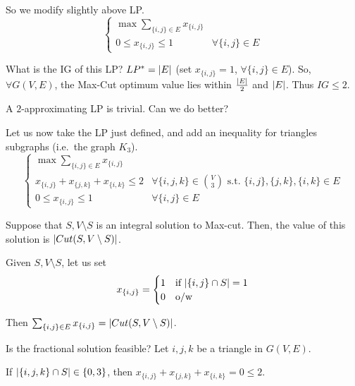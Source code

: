     So we modify slightly above LP.\@
    \begin{equation}
        \begin{cases}
            \max \sum_{\{i,j\} \in E} x_{\{i,j\}}\\
            0 \leq x_{\{i,j\}} \leq 1               & \forall \{i,j\} \in E
        \end{cases}
    \end{equation}

    What is the IG of this LP?
    $LP^* = \vert E \vert$ (set $x_{\{i,j\}} = 1$, $\forall \{i,j\} \in E$).
    So, $\forall G(V,E)$, the Max-Cut optimum value lies within $\frac{\vert E \vert}{2}$ and $\vert E \vert$.
    Thus $IG \leq 2$.

    A $2$-approximating LP is trivial. Can we do better?

    Let us now take the LP just defined, and add an inequality for triangles subgraphs (i.e.~the graph $K_3$).
    \begin{equation}
        \begin{cases}
            \max \sum_{\{i,j\} \in E} x_{\{i,j\}}\\
            x_{\{i,j\}} + x_{\{j,k\}} + x_{\{i,k\}} \leq 2  & \forall \{i,j,k\} \in \binom{V}{3} \text{ s.t. } \{i,j\}, \{j,k\}, \{i,k\} \in E\\
            0 \leq x_{\{i,j\}} \leq 1                       & \forall \{i,j\} \in E
        \end{cases}
    \end{equation}

    Suppose that $S, V \setminus S$ is an integral solution to Max-cut.
    Then, the value of this solution is $\vert Cut(S, V \setminus S) \vert$.

    Given $S, V \setminus S$, let us set
    \begin{equation}
        x_{\{i,j\}} = 
        \begin{cases}
            1 & \text{if } \vert \{i,j\} \cap S \vert = 1\\
            0 & \text{o/w}
        \end{cases}
    \end{equation}

    Then $\sum_{\{i,j\} \in E} x_{\{i,j\}} = \vert Cut(S, V \setminus S) \vert$.

    Is the fractional solution feasible? Let $i,j,k$ be a triangle in $G(V,E)$.

    If $\vert \{i,j,k\} \cap S \vert \in \{0,3\}$, then $x_{\{i,j\}} + x_{\{j,k\}} + x_{\{i,k\}} = 0 \leq 2$.

